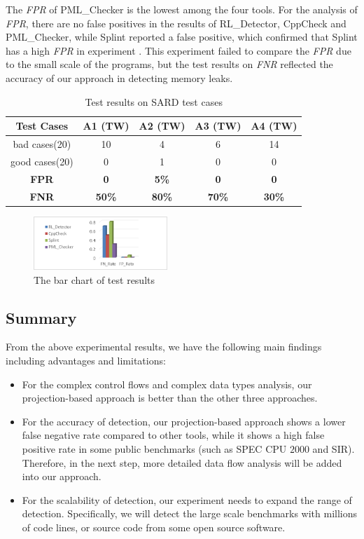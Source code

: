 The \textit{FPR} of PML\_Checker is the lowest among the four tools. For the analysis of \textit{FPR}, there are no false positives in the results of RL\_Detector, CppCheck and PML\_Checker, while Splint reported a false positive, which confirmed that Splint has a high \textit{FPR} in experiment . This experiment failed to compare the \textit{FPR} due to the small scale of the programs, but the test results on \textit{FNR} reflected the accuracy of our approach in detecting memory leaks.

\begin{table}[!h]
\center
\caption{Test results on SARD test cases}\label{tab:7}
\begin{tabular}{|c|c|c|c|c|}
\hline
\textbf{Test Cases} & \textbf{A1} (TW)& \textbf{A2} (TW) & \textbf{A3} (TW) & \textbf{A4} (TW)\\
\hline
bad cases(20) &10 & 4 & 6 & 14\\
\hline
good cases(20) & 0 & 	1 &	0 &	0\\
\hline
\textbf{FPR} & \textbf{0}& \textbf{5\%} & \textbf{0} & \textbf{0}\\
\hline
\textbf{FNR} & \textbf{50\%}& \textbf{80\%} & \textbf{70\%} & \textbf{30\%}\\
\hline
\end{tabular}
\end{table}

\begin{figure}[!h]
\center
\includegraphics[width=0.45\textwidth]{figure/fig8-fig12/fig12}
\caption{The bar chart of test results}
\label{fig:12}
\end{figure}

\subsection{Summary}
From the above experimental results, we have the following main findings including advantages and limitations: 
\begin{itemize}
\item 
For the complex control flows and complex data types analysis, our projection-based approach is better than the other three approaches.
\item 
For the accuracy of detection, our projection-based approach shows a lower false negative rate compared to other tools, while it shows a high false positive rate in some public benchmarks (such as SPEC CPU $2000$ and SIR). Therefore, in the next step, more detailed data flow analysis will be added into our approach.
\item 
For the scalability of detection, our experiment needs to expand the range of detection. Specifically, we will detect the large scale benchmarks with millions of code lines, or source code from some open source software.
\end{itemize}
